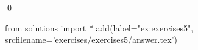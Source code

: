 
\begin{ex} 
  \label{ex:exercises5}
  
  \qed
\end{ex} 
\begin{python0}
from solutions import *
add(label="ex:exercises5",
    srcfilename='exercises/exercises5/answer.tex') 
\end{python0}
